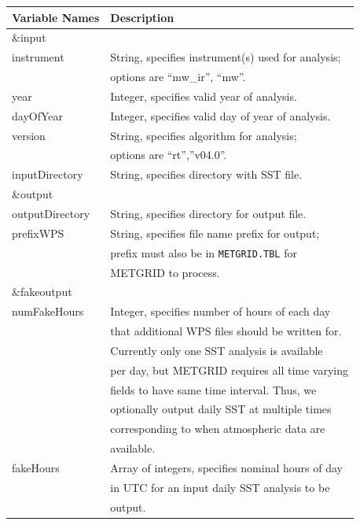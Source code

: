 \begin{tabular}{|l|l|} \hline
Variable Names & Description \\ \hline
\&input          & \\ \hline
instrument & String, specifies instrument(s) used for analysis; \\ 
           & options are ``mw\_ir'', ``mw''. \\  \hline
year & Integer, specifies valid year of analysis. \\ \hline
dayOfYear & Integer, specifies valid day of year of analysis. \\ \hline
version & String, specifies algorithm for analysis; \\
        & options are ``rt'',''v04.0''. \\ \hline
inputDirectory & String, specifies directory with SST file. \\ \hline
\&output & \\ \hline
outputDirectory & String, specifies directory for output file. \\ \hline
prefixWPS & String, specifies file name prefix for output; \\ 
          & prefix must also be in \texttt{METGRID.TBL} for \\
          & METGRID to process. \\ \hline
\&fakeoutput & \\ \hline
numFakeHours & Integer, specifies number of hours of each day \\ 
             & that additional WPS files should be written for. \\
             & Currently only one SST analysis is available \\
             & per day, but METGRID requires all time varying \\
             & fields to have same time interval. Thus, we \\
             & optionally output daily SST at multiple times \\
             & corresponding to when atmospheric data are \\
             & available. \\ \hline
fakeHours & Array of integers, specifies nominal hours of day \\
          & in UTC for an input daily SST analysis to be \\
          & output. \\ \hline
\end{tabular} \\

